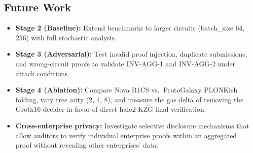 \subsection{Future Work}

\begin{itemize}
  \item \textbf{Stage 2 (Baseline):} Extend benchmarks to larger
    circuits (batch\_size 64, 256) with full stochastic analysis.
  \item \textbf{Stage 3 (Adversarial):} Test invalid proof injection,
    duplicate submissions, and wrong-circuit proofs to validate
    INV-AGG-1 and INV-AGG-2 under attack conditions.
  \item \textbf{Stage 4 (Ablation):} Compare Nova R1CS vs.\ ProtoGalaxy
    PLONKish folding, vary tree arity (2, 4, 8), and measure the gas
    delta of removing the Groth16 decider in favor of direct halo2-KZG
    final verification.
  \item \textbf{Cross-enterprise privacy:} Investigate selective
    disclosure mechanisms that allow auditors to verify individual
    enterprise proofs within an aggregated proof without revealing other
    enterprises' data.
\end{itemize}
